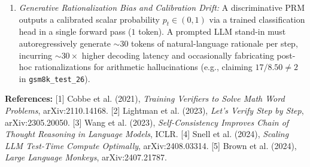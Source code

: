 \documentclass[10pt,a4paper]{article}
\begin{document}
\begin{itemize}
\begin{enumerate}
        \item \textit{Generative Rationalization Bias and Calibration Drift:} A discriminative PRM outputs a calibrated scalar probability $p_t \in (0,1)$ via a trained classification head in a single forward pass ($1$ token). A prompted LLM stand-in must autoregressively generate $\sim 30$ tokens of natural-language rationale per step, incurring $\sim 30\times$ higher decoding latency and occasionally fabricating post-hoc rationalizations for arithmetic hallucinations (e.g., claiming $17 / 8.50 \ne 2$ in \texttt{gsm8k\_test\_26}).
    \end{enumerate}
\end{itemize}

\vspace{-4pt}
\footnotesize
\textbf{References:} [1] Cobbe et al. (2021), \textit{Training Verifiers to Solve Math Word Problems}, arXiv:2110.14168. [2] Lightman et al. (2023), \textit{Let's Verify Step by Step}, arXiv:2305.20050. [3] Wang et al. (2023), \textit{Self-Consistency Improves Chain of Thought Reasoning in Language Models}, ICLR. [4] Snell et al. (2024), \textit{Scaling LLM Test-Time Compute Optimally}, arXiv:2408.03314. [5] Brown et al. (2024), \textit{Large Language Monkeys}, arXiv:2407.21787.
\end{document}
